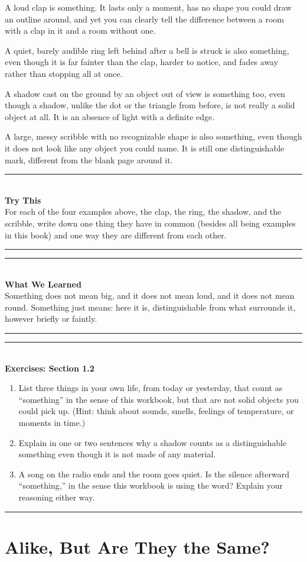 \documentclass[11pt]{book}
\newenvironment{exercisebox}[1]{%
\vspace{0.8em}\noindent\rule{\linewidth}{0.6pt}\\[0.2em]\textbf{Exercises: #1}\\[0.3em]%
\begin{enumerate}[label=\arabic*., itemsep=0.4em]}%
{\end{enumerate}\noindent\rule{\linewidth}{0.6pt}\vspace{0.6em}}
\newenvironment{trythis}{%
\vspace{0.6em}\noindent\rule{\linewidth}{0.6pt}\\[0.2em]\textbf{Try This}\\[0.3em]}%
{\\[0.2em]\noindent\rule{\linewidth}{0.6pt}\vspace{0.6em}}
\newenvironment{summarybox}{%
\vspace{0.6em}\noindent\rule{\linewidth}{0.6pt}\\[0.2em]\textbf{What We Learned}\\[0.3em]}%
{\\[0.2em]\noindent\rule{\linewidth}{0.6pt}\vspace{0.6em}}
\begin{document}
A loud clap is something. It lasts only a moment, has no shape you could draw an outline around, and yet you can clearly tell the difference between a room with a clap in it and a room without one.

A quiet, barely audible ring left behind after a bell is struck is also something, even though it is far fainter than the clap, harder to notice, and fades away rather than stopping all at once.

A shadow cast on the ground by an object out of view is something too, even though a shadow, unlike the dot or the triangle from before, is not really a solid object at all. It is an absence of light with a definite edge.

A large, messy scribble with no recognizable shape is also something, even though it does not look like any object you could name. It is still one distinguishable mark, different from the blank page around it.

\begin{trythis}
For each of the four examples above, the clap, the ring, the shadow, and the scribble, write down one thing they have in common (besides all being examples in this book) and one way they are different from each other.
\end{trythis}

\begin{summarybox}
Something does not mean big, and it does not mean loud, and it does not mean round. Something just means: here it is, distinguishable from what surrounds it, however briefly or faintly.
\end{summarybox}

\begin{exercisebox}{Section 1.2}
\item List three things in your own life, from today or yesterday, that count as ``something'' in the sense of this workbook, but that are not solid objects you could pick up. (Hint: think about sounds, smells, feelings of temperature, or moments in time.)
\item Explain in one or two sentences why a shadow counts as a distinguishable something even though it is not made of any material.
\item A song on the radio ends and the room goes quiet. Is the silence afterward ``something,'' in the sense this workbook is using the word? Explain your reasoning either way.
\end{exercisebox}

\chapter{Alike, But Are They the Same?}
\end{document}
